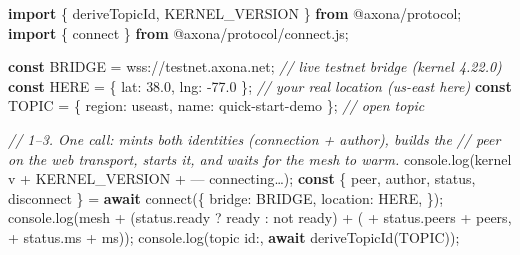 \documentclass[
  nobib]{tufte-handout}
\newenvironment{Shaded}{}{}
\newcommand{\AttributeTok}[1]{\textcolor[rgb]{0.49,0.56,0.16}{#1}}
\newcommand{\BuiltInTok}[1]{\textcolor[rgb]{0.00,0.50,0.00}{#1}}
\newcommand{\CommentTok}[1]{\textcolor[rgb]{0.38,0.63,0.69}{\textit{#1}}}
\newcommand{\ControlFlowTok}[1]{\textcolor[rgb]{0.00,0.44,0.13}{\textbf{#1}}}
\newcommand{\DataTypeTok}[1]{\textcolor[rgb]{0.56,0.13,0.00}{#1}}
\newcommand{\FloatTok}[1]{\textcolor[rgb]{0.25,0.63,0.44}{#1}}
\newcommand{\FunctionTok}[1]{\textcolor[rgb]{0.02,0.16,0.49}{#1}}
\newcommand{\ImportTok}[1]{\textcolor[rgb]{0.00,0.50,0.00}{\textbf{#1}}}
\newcommand{\KeywordTok}[1]{\textcolor[rgb]{0.00,0.44,0.13}{\textbf{#1}}}
\newcommand{\NormalTok}[1]{#1}
\newcommand{\OperatorTok}[1]{\textcolor[rgb]{0.40,0.40,0.40}{#1}}
\newcommand{\StringTok}[1]{\textcolor[rgb]{0.25,0.44,0.63}{#1}}
\begin{document}
\begin{Shaded}
\begin{Highlighting}[]
\ImportTok{import}\NormalTok{ \{ deriveTopicId}\OperatorTok{,}\NormalTok{ KERNEL\_VERSION \} }\ImportTok{from} \StringTok{\textquotesingle{}@axona/protocol\textquotesingle{}}\OperatorTok{;}
\ImportTok{import}\NormalTok{ \{ connect \} }\ImportTok{from} \StringTok{\textquotesingle{}@axona/protocol/connect.js\textquotesingle{}}\OperatorTok{;}

\KeywordTok{const}\NormalTok{ BRIDGE }\OperatorTok{=} \StringTok{\textquotesingle{}wss://testnet.axona.net\textquotesingle{}}\OperatorTok{;}           \CommentTok{// live testnet bridge (kernel 4.22.0)}
\KeywordTok{const}\NormalTok{ HERE   }\OperatorTok{=}\NormalTok{ \{ }\DataTypeTok{lat}\OperatorTok{:} \FloatTok{38.0}\OperatorTok{,} \DataTypeTok{lng}\OperatorTok{:} \OperatorTok{{-}}\FloatTok{77.0}\NormalTok{ \}}\OperatorTok{;}           \CommentTok{// your real location (us{-}east here)}
\KeywordTok{const}\NormalTok{ TOPIC  }\OperatorTok{=}\NormalTok{ \{ }\DataTypeTok{region}\OperatorTok{:} \StringTok{\textquotesingle{}useast\textquotesingle{}}\OperatorTok{,} \DataTypeTok{name}\OperatorTok{:} \StringTok{\textquotesingle{}quick{-}start{-}demo\textquotesingle{}}\NormalTok{ \}}\OperatorTok{;}   \CommentTok{// open topic}

\CommentTok{// 1–3. One call: mints both identities (connection + author), builds the}
\CommentTok{//      peer on the web transport, starts it, and waits for the mesh to warm.}
\BuiltInTok{console}\OperatorTok{.}\FunctionTok{log}\NormalTok{(}\StringTok{\textquotesingle{}kernel v\textquotesingle{}} \OperatorTok{+}\NormalTok{ KERNEL\_VERSION }\OperatorTok{+} \StringTok{\textquotesingle{} — connecting…\textquotesingle{}}\NormalTok{)}\OperatorTok{;}
\KeywordTok{const}\NormalTok{ \{ peer}\OperatorTok{,}\NormalTok{ author}\OperatorTok{,}\NormalTok{ status}\OperatorTok{,}\NormalTok{ disconnect \} }\OperatorTok{=} \ControlFlowTok{await} \FunctionTok{connect}\NormalTok{(\{}
  \DataTypeTok{bridge}\OperatorTok{:}\NormalTok{   BRIDGE}\OperatorTok{,}
  \DataTypeTok{location}\OperatorTok{:}\NormalTok{ HERE}\OperatorTok{,}
\NormalTok{\})}\OperatorTok{;}
\BuiltInTok{console}\OperatorTok{.}\FunctionTok{log}\NormalTok{(}\StringTok{\textquotesingle{}mesh \textquotesingle{}} \OperatorTok{+}\NormalTok{ (status}\OperatorTok{.}\AttributeTok{ready} \OperatorTok{?} \StringTok{\textquotesingle{}ready\textquotesingle{}} \OperatorTok{:} \StringTok{\textquotesingle{}not ready\textquotesingle{}}\NormalTok{) }\OperatorTok{+} \StringTok{\textquotesingle{} (\textquotesingle{}} \OperatorTok{+}\NormalTok{ status}\OperatorTok{.}\AttributeTok{peers} \OperatorTok{+} \StringTok{\textquotesingle{} peers, \textquotesingle{}} \OperatorTok{+}\NormalTok{ status}\OperatorTok{.}\AttributeTok{ms} \OperatorTok{+} \StringTok{\textquotesingle{}ms)\textquotesingle{}}\NormalTok{)}\OperatorTok{;}
\BuiltInTok{console}\OperatorTok{.}\FunctionTok{log}\NormalTok{(}\StringTok{\textquotesingle{}topic id:\textquotesingle{}}\OperatorTok{,} \ControlFlowTok{await} \FunctionTok{deriveTopicId}\NormalTok{(TOPIC))}\OperatorTok{;}


\end{Highlighting}
\end{Shaded}
\end{document}
